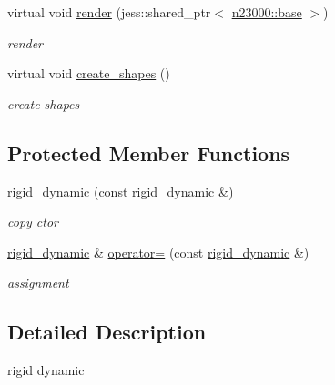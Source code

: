 \begin{DoxyCompactItemize}
virtual void \hyperlink{classnebula_1_1content_1_1actor_1_1admin_1_1rigid__dynamic_a891dd9d18ef100af72427ebaea9e473a}{render} (jess::shared\_\-ptr$<$ \hyperlink{classnebula_1_1platform_1_1renderer_1_1base}{n23000::base} $>$)
\begin{DoxyCompactList}\small\item\em render \item\end{DoxyCompactList}\item 
virtual void \hyperlink{classnebula_1_1content_1_1actor_1_1admin_1_1rigid__dynamic_a263f07931e9281ea4044c522b567dde1}{create\_\-shapes} ()
\begin{DoxyCompactList}\small\item\em create shapes \item\end{DoxyCompactList}\end{DoxyCompactItemize}
\subsection*{Protected Member Functions}
\begin{DoxyCompactItemize}
\item 
\hyperlink{classnebula_1_1content_1_1actor_1_1admin_1_1rigid__dynamic_abba95050bbb411bf138f825670b9bedf}{rigid\_\-dynamic} (const \hyperlink{classnebula_1_1content_1_1actor_1_1admin_1_1rigid__dynamic}{rigid\_\-dynamic} \&)
\begin{DoxyCompactList}\small\item\em copy ctor \item\end{DoxyCompactList}\item 
\hyperlink{classnebula_1_1content_1_1actor_1_1admin_1_1rigid__dynamic}{rigid\_\-dynamic} \& \hyperlink{classnebula_1_1content_1_1actor_1_1admin_1_1rigid__dynamic_accf38f3f07acdbe924c46388230d2e99}{operator=} (const \hyperlink{classnebula_1_1content_1_1actor_1_1admin_1_1rigid__dynamic}{rigid\_\-dynamic} \&)
\begin{DoxyCompactList}\small\item\em assignment \item\end{DoxyCompactList}\end{DoxyCompactItemize}


\subsection{Detailed Description}
rigid dynamic 

